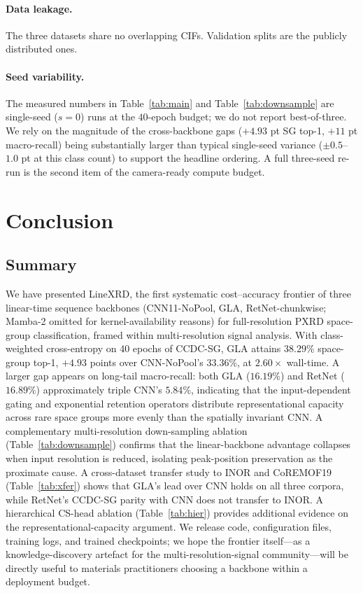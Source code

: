 \documentclass[final]{ws-ijwmip}
\begin{document}
\paragraph{Data leakage.} The three datasets share no overlapping CIFs.
Validation splits are the publicly distributed ones.

\paragraph{Seed variability.} The measured numbers in
Table~\ref{tab:main} and Table~\ref{tab:downsample} are single-seed
($s\!=\!0$) runs at the $40$-epoch budget; we do not report
best-of-three. We rely on the magnitude of the cross-backbone gaps
($+4.93$ pt SG top-1, $+11$ pt macro-recall) being substantially
larger than typical single-seed variance ($\pm 0.5$--$1.0$ pt at this
class count) to support the headline ordering. A full three-seed
re-run is the second item of the camera-ready compute budget.



\section{Conclusion}
\label{sec:conclusion}

\subsection{Summary}

We have presented LineXRD, the first systematic cost--accuracy frontier
of three linear-time sequence backbones (CNN11-NoPool, GLA,
RetNet-chunkwise; Mamba-2 omitted for kernel-availability reasons)
for full-resolution PXRD space-group classification, framed
within multi-resolution signal analysis. With class-weighted
cross-entropy on 40 epochs of CCDC-SG, GLA attains $38.29\%$
space-group top-1, $+4.93$ points over CNN-NoPool's $33.36\%$, at
$2.60\times$ wall-time. A larger gap appears on long-tail
macro-recall: both GLA ($16.19\%$) and RetNet ($16.89\%$) approximately
triple CNN's $5.84\%$, indicating that the input-dependent gating and
exponential retention operators distribute representational capacity
across rare space groups more evenly than the spatially invariant CNN. A complementary multi-resolution down-sampling
ablation (Table~\ref{tab:downsample}) confirms that the linear-backbone
advantage collapses when input resolution is reduced, isolating
peak-position preservation as the proximate cause. A cross-dataset transfer study to INOR and CoREMOF19
(Table~\ref{tab:xfer}) shows that GLA's lead over CNN holds on all
three corpora, while RetNet's CCDC-SG parity with CNN does not
transfer to INOR. A hierarchical CS-head ablation
(Table~\ref{tab:hier}) provides additional evidence on the
representational-capacity argument. We release code,
configuration files, training logs, and trained checkpoints; we hope
the frontier itself---as a knowledge-discovery artefact for the
multi-resolution-signal community---will be directly useful to
materials practitioners choosing a backbone within a deployment
budget.
\end{document}
